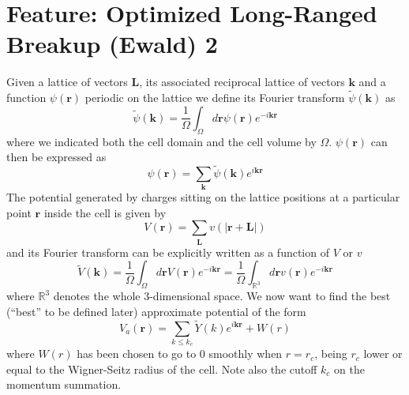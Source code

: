 \newpage
\section{Feature: Optimized Long-Ranged Breakup (Ewald) 2}


\newcommand{\rv}{\mathbf{r}}
\newcommand{\kv}{\mathbf{k}}
\newcommand{\Rv}{\mathbf{R}}
\newcommand{\Lv}{\mathbf{L}}
\newcommand{\Rc}{\mathcal{R}}
\newcommand{\tV}{\widetilde{V}}
\newcommand{\tW}{\widetilde{W}}
\newcommand{\tc}{\widetilde{c}}
\newcommand{\tY}{\widetilde{Y}}
\newcommand{\Nk}{N_{\text{knot}}}
\newcommand{\wk}{w_{\text{knot}}}

Given a lattice of vectors $\Lv$, its associated reciprocal
lattice of vectors $\kv$ and a function $\psi(\rv)$ periodic
on the lattice we define its Fourier transform $\widetilde{\psi}(\kv)$ as
\begin{equation}
\widetilde{\psi}(\kv)=\frac{1}{\Omega}\int_\Omega d\rv \psi(\rv) e^{-i\kv\rv}
\end{equation}
where we indicated both the cell domain and the cell volume by $\Omega$. 
$\psi(\rv)$ can then be expressed as
\begin{equation}
\psi(\rv)=\sum_{\kv} \widetilde{\psi}(\kv)e^{i\kv\rv}
\end{equation}
The potential generated by charges sitting on the lattice positions
at a particular point $\rv$ inside the cell is given by
\begin{equation}
V(\rv)=\sum_{\Lv}v(|\rv+\Lv|)
\end{equation}
and its Fourier transform can be explicitly written as a function of $V$ or $v$
\begin{equation}
\widetilde{V}(\kv)=\frac{1}{\Omega}\int_\Omega d\rv V(\rv) e^{-i\kv\rv}=
\frac{1}{\Omega}\int_{\mathbb{R}^3} d\rv v(\rv) e^{-i\kv\rv}
\end{equation}
where $\mathbb{R}^3$ denotes the whole 3-dimensional space.
We now want to find the best (``best'' to be defined later) approximate 
potential of the form
\begin{equation}
V_a(\rv)=\sum_{k\le k_c} \widetilde{Y}(k) e^{i\kv\rv} + W(r)
\end{equation}
where $W(r)$ has been chosen to go to $0$ smoothly when $r=r_c$, being
$r_c$ lower or equal to the Wigner-Seitz radius of the cell. Note also
the cutoff $k_c$ on the momentum summation.

